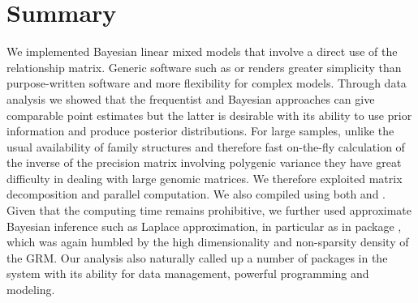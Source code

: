 \documentclass[article]{jss}
\begin{document}
\section{Summary}

We implemented Bayesian linear mixed models that involve a direct use
of the relationship matrix. Generic software such as  or
 renders greater simplicity than purpose-written
software and more flexibility for complex models. Through data
analysis we showed that the frequentist and Bayesian approaches can
give comparable point estimates but the latter is desirable with its
ability to use prior information and produce posterior
distributions. For large samples, unlike the usual availability of
family structures and therefore fast on-the-fly calculation of the
inverse of the precision matrix involving polygenic variance
\citep{waldmann09, damgaard07} they have great difficulty in dealing
with large genomic matrices. We therefore exploited matrix
decomposition and parallel computation. We also compiled 
using both  and . Given that the computing
time remains prohibitive, we further used approximate Bayesian
inference such as Laplace approximation, in particular  as
in package , which was again humbled by the high
dimensionality and non-sparsity density of the GRM. Our analysis also
naturally called up a number of packages in the  system
with its ability for data management, powerful programming and
modeling.
\end{document}
